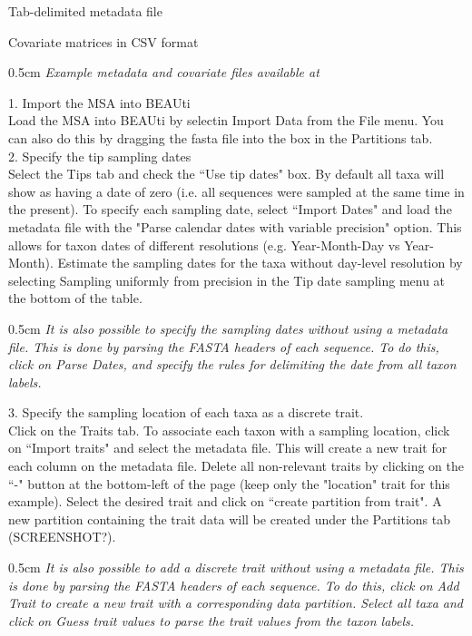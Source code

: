 \documentclass{article}
\newcommand{\ann}[1]{
\begin{adjustwidth}{0.5cm}{}
\it{#1}\\
\end{adjustwidth}}
\newcommand{\code}[1]{
{\upshape\ttfamily{#1}}}
\begin{document}
\hspace{0.5cm}Tab-delimited metadata file

\hspace{0.5cm}Covariate matrices in CSV format\\

\ann{Example metadata and covariate files available at\code{gihutb}}

1. Import the MSA into BEAUti\\

Load the MSA into BEAUti by selectin Import Data from the File menu. You can also do this by dragging the fasta file into the box in the Partitions tab.\\

2. Specify the tip sampling dates\\

Select the Tips tab and check the ``Use tip dates" box. By default all taxa will show as having a date of zero (i.e. all sequences were sampled at the same time in the present). To specify each sampling date, select ``Import Dates" and load the metadata file with the "Parse calendar dates with variable precision" option. This allows for taxon dates of different resolutions (e.g. Year-Month-Day vs Year-Month). Estimate the sampling dates for the taxa without day-level resolution by selecting Sampling uniformly from precision in the Tip date sampling menu at the bottom of the table. \\

\ann{It is also possible to specify the sampling dates without using a metadata file. This is done by parsing the FASTA headers of each sequence. To do this, click on Parse Dates, and specify the rules for delimiting the date from all taxon labels.}

3. Specify the sampling location of each taxa as a discrete trait.\\

Click on the Traits tab. To associate each taxon with a sampling location, click on ``Import traits" and select the metadata file. This will create a new trait for each column on the metadata file. Delete all non-relevant traits by clicking on the ``-" button at the bottom-left of the page (keep only the "location" trait for this example). Select the desired trait and click on ``create partition from trait". A new partition containing the trait data will be created under the Partitions tab (SCREENSHOT?).\\

\ann{It is also possible to add a discrete trait without using a metadata file. This is done by parsing the FASTA headers of each sequence. To do this, click on Add Trait to create a new trait with a corresponding data partition. Select all taxa and click on Guess trait values to parse the trait values from the taxon labels.}
\end{document}
